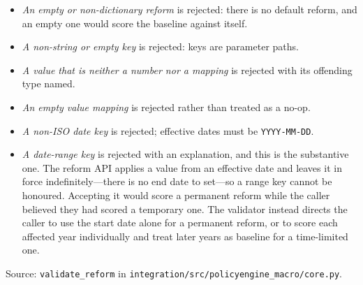 \begin{itemize}
\item \emph{An empty or non-dictionary reform} is rejected: there is no default reform, and an empty one would score the baseline against itself.
\item \emph{A non-string or empty key} is rejected: keys are parameter paths.
\item \emph{A value that is neither a number nor a mapping} is rejected with its offending type named.
\item \emph{An empty value mapping} is rejected rather than treated as a no-op.
\item \emph{A non-ISO date key} is rejected; effective dates must be \texttt{YYYY-MM-DD}.
\item \emph{A date-range key} is rejected with an explanation, and this is the substantive one. The reform API applies a value from an effective date and leaves it in force indefinitely---there is no end date to set---so a range key cannot be honoured. Accepting it would score a permanent reform while the caller believed they had scored a temporary one. The validator instead directs the caller to use the start date alone for a permanent reform, or to score each affected year individually and treat later years as baseline for a time-limited one.
\end{itemize}

\noindent Source: \texttt{validate\_reform} in \texttt{integration/src/policyengine\_macro/core.py}.
